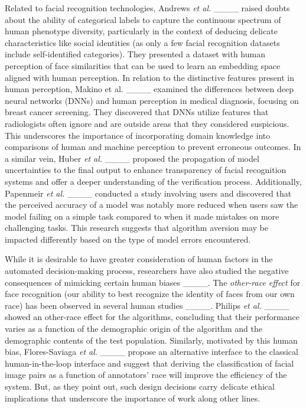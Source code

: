 Related to facial recognition technologies, Andrews {\em et al.} ____ raised doubts about the ability of categorical labels to capture the continuous spectrum of human phenotype diversity, particularly in the context of deducing delicate characteristics like social identities (as only a few facial recognition datasets include self-identified categories). They presented a dataset with human perception of face similarities that can be used to learn an embedding space aligned with human perception.
In relation to the distinctive features present in human perception, Makino et al. ____ examined the differences between deep neural networks (DNNs) and human perception in medical diagnosis, focusing on breast cancer screening. They discovered that DNNs utilize features that radiologists often ignore and are outside areas that they considered suspicious. This underscores the importance of incorporating domain knowledge into comparisons of human and machine perception to prevent erroneous outcomes.
%
In a similar vein, Huber {\em et al.} ____ proposed the propagation of model uncertainties to the final output to enhance transparency of facial recognition systems and offer a deeper understanding of the verification process. 
%
Additionally, Papenmeir {\em et al.} ____ conducted a study involving users and discovered that the perceived accuracy of a model was notably more reduced when users saw the model failing on a simple task compared to when it made mistakes on more challenging tasks. This research suggests that algorithm aversion may be impacted differently based on the type of model errors encountered.
%

While it is desirable to have greater consideration of human factors in the automated decision-making process, researchers have also studied the negative consequences of mimicking certain human biases ____. The \textit{other-race effect} for face recognition (our ability to best recognize the identity of faces from our own race) has been observed in several human studies ____. Philips {\em et al.} ____ showed an other-race effect for the algorithms, concluding that their performance varies as a function of the demographic origin of the algorithm and the demographic contents of the test population. Similarly, motivated by this human bias, Flores-Saviaga {\em et al.} ____ propose an alternative interface to the classical human-in-the-loop interface and suggest that deriving the classification of facial image pairs as a function of annotators' race will improve the efficiency of the system. But, as they point out, such design decisions carry delicate ethical implications that underscore the importance of work along other lines.
%

